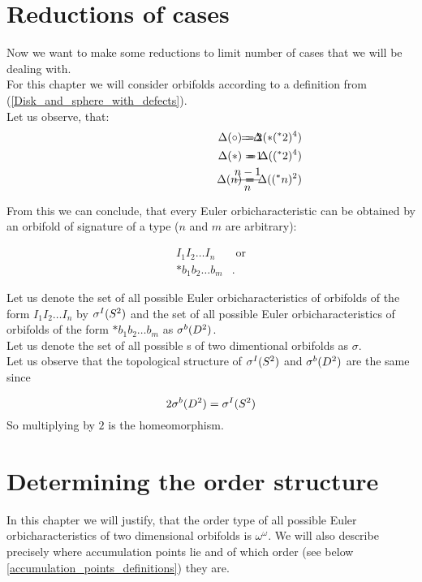 \section{Reductions of cases}
Now we want to make some reductions to limit number of cases that we will be dealing with. \\
For this chapter we will consider orbifolds according to a definition from 
(\ref{Disk_and_sphere_with_defects}). \\
Let us observe, that:
\begin{align*}
\hspace{3cm}\Delta(\circ) =& \hspace{-1cm} &-2& \hspace{-1cm} &= \Delta(*(^*2)^4) \\
\hspace{3cm}\Delta(*) =& \hspace{-1cm} &-1& \hspace{-1cm} &= \Delta((^*2)^4) \\
\hspace{3cm}\Delta(n) =& \hspace{-1cm} &\frac{n-1}{n}& \hspace{-1cm} &= \Delta((^*n)^2)
\end{align*}

From this we can conclude, that every Euler orbicharacteristic can be obtained 
by an orbifold of signature of a type ($n$ and $m$ are arbitrary):

\begin{align*}
I_1I_2\dots I_n & \textrm{\ or} \\
*b_1b_2\dots b_m &.
\end{align*}

Let us denote the set of all possible Euler orbicharacteristics of orbifolds of the form 
$I_1I_2\dots I_n$ by ${\mathcal{\sigma}^I(S^2)}$ and the set 
of all possible Euler orbicharacteristics of orbifolds of the form $*b_1b_2\dots b_m$ 
as ${\mathcal{\sigma}^b(D^2)}$. \\
Let us denote the set of all possible \Eoc s of two dimentional orbifolds as $\sigma$. \\
Let us observe that the topological structure of ${\mathcal{\sigma}^I(S^2)}$ and ${\mathcal{\sigma}^b(D^2)}$ are the same since 

\begin{equation*}
2{\mathcal{\sigma}^b(D^2)}={\mathcal{\sigma}^I(S^2)}
\end{equation*}
So multiplying by $2$ is the homeomorphism. 
\section{Determining the order structure}
In this chapter we will justify, that the order type of all possible Euler orbicharacteristics 
of two dimensional orbifolds is $\omega^\omega$. 
We will also describe precisely where accumulation points lie and of which order 
(see below \ref{accumulation_points_definitions}) they are.

